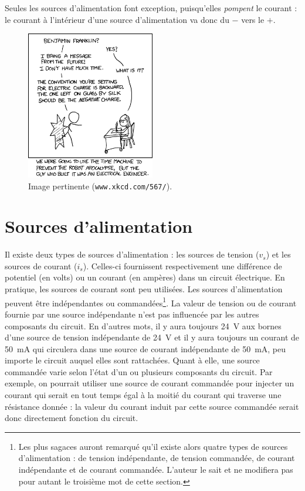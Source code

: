 \documentclass[12pt,oneside,letterpaper]{article}
\begin{document}
Seules les sources d'alimentation font exception, puisqu'elles \textit{pompent} le courant : le courant à l'intérieur d'une source d'alimentation va donc du $-$ vers le $+$.

\begin{figure}[h]
\begin{center}
\includegraphics[width=0.5\textwidth]{xkcd-567}
\caption{\label{xkcd}Image pertinente (\texttt{www.xkcd.com/567/}).}
\end{center}
\end{figure}


\section{Sources d'alimentation}

Il existe deux types de sources d'alimentation : les sources de tension ($v_s$) et les sources de courant ($i_s$). Celles-ci fournissent respectivement une différence de potentiel (en volts) ou un courant (en ampères) dans un circuit électrique. En pratique, les sources de courant sont peu utilisées. Les sources d'alimentation peuvent être indépendantes ou commandées\footnote{Les plus sagaces auront remarqué qu'il existe alors quatre types de sources d'alimentation : de tension indépendante, de tension commandée, de courant indépendante et de courant commandée. L'auteur le sait et ne modifiera pas pour autant le troisième mot de cette section.}. La valeur de tension ou de courant fournie par une source indépendante n'est pas influencée par les autres composants du circuit. En d'autres mots, il y aura toujours 24~V aux bornes d'une source de tension indépendante de 24~V et il y aura toujours un courant de 50~mA qui circulera dans une source de courant indépendante de 50~mA, peu importe le circuit auquel elles sont rattachées. Quant à elle, une source commandée varie selon l'état d'un ou plusieurs composants du circuit. Par exemple, on pourrait utiliser une source de courant commandée pour injecter un courant qui serait en tout temps égal à la moitié du courant qui traverse une résistance donnée : la valeur du courant induit par cette source commandée serait donc directement fonction du circuit.
\end{document}
